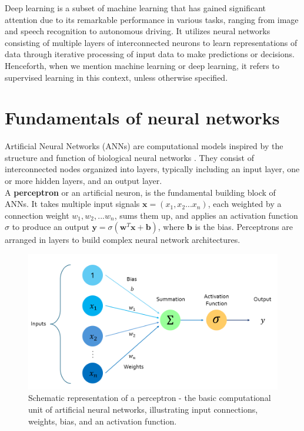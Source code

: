 Deep learning is a subset of machine learning that has gained significant attention due to its remarkable performance in various tasks, ranging from image and speech recognition to autonomous driving. It utilizes neural networks consisting of multiple layers of interconnected neurons to learn representations of data through iterative processing of input data to make predictions or decisions. Henceforth, when we mention machine learning or deep learning, it refers to supervised learning in this context, unless otherwise specified.
\section{Fundamentals of neural networks}
Artificial Neural Networks (ANNs) are computational models inspired by the structure and function of biological neural networks \cite{rumel}. They consist of interconnected nodes organized into layers, typically including an input layer, one or more hidden layers, and an output layer. \\ 
A \textbf{perceptron} or an artificial neuron, is the fundamental building block of ANNs. It takes multiple input signals $\mathbf{x}= \left(x_1, x_2 ...x_n\right)$, each weighted by a connection weight $w_1,w_2,...w_n$, sums them up, and applies an activation function $\sigma$ to produce an output $\mathbf{y} = \sigma \left(\mathbf{w}^T\mathbf{x} + \mathbf{b} \right)$, where $\mathbf{b}$ is the bias. Perceptrons are arranged in layers to build complex neural network architectures.\\
\begin{figure}[ht]
    \centering
    \includegraphics[width=12cm]{images/Theory-DL/ActFn.png}
    \caption{Schematic representation of a perceptron - the basic computational unit of artificial neural networks, illustrating input connections, weights, bias, and an activation function.}
    \label{fig:Perceptron}
  \end{figure}

